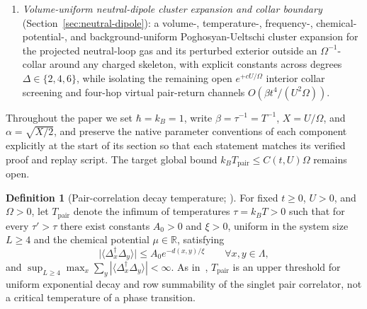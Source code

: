 \documentclass[11pt]{article}
\theoremstyle{definition}
\newtheorem{definition}[theorem]{Definition}
\theoremstyle{remark}
\newcommand{\R}{\mathbb{R}}
\newcommand{\Tpair}{T_{\mathrm{pair}}}
\newcommand{\Dop}{\Delta}
\begin{document}
\begin{enumerate}[leftmargin=1.5em]
summability while a spatially weighted exponential-moment closing estimate
yields $k_B \Tpair \le C(t,U)\Omega$, the universal static Combes-Thomas base
bound $K_0 = (1+\pi/4)^2$ (plus an interval-certified $V=6$ Schur test), an
exact $t=0$ nine-component marginal and barrier-to-well density ratio
$R_0(B;\beta,U)$ that annihilates the staggered instanton, an unconditional
$V=2$ operator-norm proof of the endpoint bound, the exact $s=0$ derivative
constant $C_1^{\mathrm{phys}} = 1/24 + \zeta(3)/(8\pi^3)$, and the
$\Omega \to \infty$ attractive Hubbard anchor together with two remaining
closure barriers.
\item \emph{Volume-uniform neutral-dipole cluster expansion and collar
boundary} (Section~\ref{sec:neutral-dipole}): a volume-, temperature-,
frequency-, chemical-potential-, and background-uniform Poghosyan-Ueltschi
cluster expansion for the projected neutral-loop gas and its perturbed exterior
outside an $\Omega^{-1}$-collar around any charged skeleton, with explicit
constants across degrees $\Delta \in \{2,4,6\}$, while isolating the remaining
open $e^{+cU/\Omega}$ interior collar screening and four-hop virtual
pair-return channels $O(\beta t^4/(U^2\Omega))$.
\end{enumerate}

Throughout the paper we set $\hbar = k_B = 1$, write $\beta = \tau^{-1} = T^{-1}$,
$X = U/\Omega$, and $\alpha = \sqrt{X/2}$, and preserve the native parameter
conventions of each component explicitly at the start of its section so that
each statement matches its verified proof and replay script. The target global
bound $k_B \Tpair \le C(t,U)\Omega$ remains open.

\begin{definition}[Pair-correlation decay temperature; \cite{largeu,strong,barriers3}]
\label{def:tpair}
For fixed $t \ge 0$, $U > 0$, and $\Omega > 0$, let $\Tpair$ denote the infimum
of temperatures $\tau = k_B T > 0$ such that for every $\tau' > \tau$ there
exist constants $A_0 > 0$ and $\xi > 0$, uniform in the system size $L \ge 4$
and the chemical potential $\mu \in \R$, satisfying
\begin{equation}
\label{eq:tpair-def}
\bigl|\langle \Dop_x^\dagger \Dop_y \rangle\bigr| \le A_0 e^{-d(x,y)/\xi}
\qquad \forall x, y \in \Lambda,
\end{equation}
and $\sup_{L \ge 4} \max_x \sum_y |\langle \Dop_x^\dagger \Dop_y \rangle| < \infty$.
As in~\cite{barriers3}, $\Tpair$ is an upper threshold for uniform exponential
decay and row summability of the singlet pair correlator, not a critical
temperature of a phase transition.
\end{definition}
\end{document}
